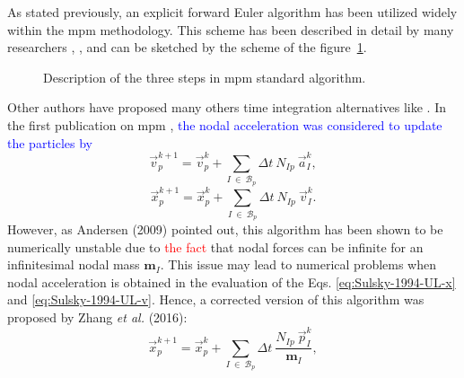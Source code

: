 \documentclass[preprint,12pt,a4paper]{elsarticle}
\newcommand{\tens}[1]{
  \ensuremath{\mathbf{{#1}}}
}
\begin{document}
As stated previously, an explicit forward Euler algorithm has been utilized widely within the \acrshort{mpm} methodology. This scheme has been described in detail by many researchers
\cite{Sulsky1994}, \cite{Bardenhagen2002}, \cite{thesis_Andersen_2009} and can be sketched by the scheme of the figure~\ref{fig:MPM_algorithm}.
\begin{figure}
  \centering
  \caption{Description of the three steps in \acrshort{mpm} standard algorithm.}
  \label{fig:MPM_algorithm}
\end{figure}
Other authors have proposed many others time integration alternatives
like \cite{Guilkey_2003,Charlton_2017,Tran2019e}. In the
first publication on \acrshort{mpm} \cite{Sulsky1994}, \textcolor{blue}{the nodal acceleration
was considered to update the particles by}
\begin{equation}
  \label{eq:Sulsky-1994-UL-v}
  \vec{v}_p^{k+1} = \vec{v}_p^{k} + \sum_{I\ \in\ \mathcal{B}_p} \Delta t\ N_{Ip}\ \vec{a}_{I}^{k},
\end{equation}
\begin{equation}
  \label{eq:Sulsky-1994-UL-x}
  \vec{x}_p^{k+1} = \vec{x}_p^{k} + \sum_{I\ \in\ \mathcal{B}_p} \Delta t\ N_{Ip}\ \vec{v}_{I}^{k}.
\end{equation}
However, as Andersen (2009)\cite{thesis_Andersen_2009} pointed out, this algorithm has been shown to be numerically unstable due to \textcolor{red}{the fact} that nodal forces can be infinite for an infinitesimal nodal mass $\tens{m}_I$. This issue may lead to numerical problems when nodal acceleration is obtained in the evaluation of the Eqs. \eqref{eq:Sulsky-1994-UL-x} and \eqref{eq:Sulsky-1994-UL-v}. Hence, a
corrected version of this algorithm was proposed by Zhang {\it et al.}
(2016)\cite{Zhang_book_2016}:
\begin{equation}
  \label{eq:Zhang-2016-UL-x}
  \vec{x}_p^{k+1} = \vec{x}_p^{k} + \sum_{I\ \in\ \mathcal{B}_p} \Delta t\ \frac{N_{Ip}\ \vec{p}_{I}^{k}}{\tens{m}_I}, 
\end{equation}
\end{document}

